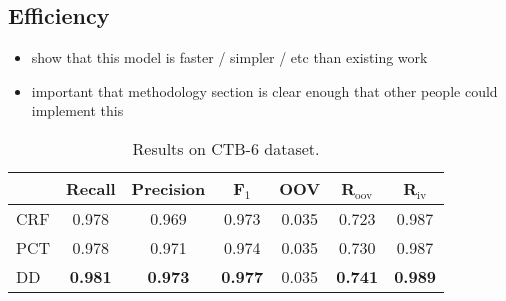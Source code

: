 \documentclass[11pt]{article}
\begin{document}
\subsection{Efficiency}
\begin{itemize}
\item show that this model is faster / simpler / etc than existing work
\item important that methodology section is clear enough that other people could implement this
\end{itemize}



\begin{table}[h]
\centering
\begin{small}
\begin{tabular}{  l | c | c | c | c | c | c   }
 &  \multicolumn{1}{c}{Recall} &  \multicolumn{1}{c}{Precision}  & \multicolumn{1}{c}{F$_1$}   &  \multicolumn{1}{c}{OOV} &   \multicolumn{1}{c|}{R$_{\mathrm{oov}}$}    &  \multicolumn{1}{c}{R$_{\mathrm{iv}}$}   \\ 

\hline
CRF          & 0.978  &  0.969  &  0.973   & 0.035  & 0.723 & 0.987 \\
PCT      & 0.978 & 0.971 & 0.974 & 0.035 & 0.730 & 0.987 \\
DD     & \textbf{0.981} & \textbf{0.973} & \textbf{0.977} & 0.035 & \textbf{0.741} & \textbf{0.989} \\
\end{tabular} 
\caption{Results on CTB-6 dataset. }\label{tbl:ctb-results}
\end{small}
\end{table}


\addtocounter{footnote}{-1}
\end{document}
